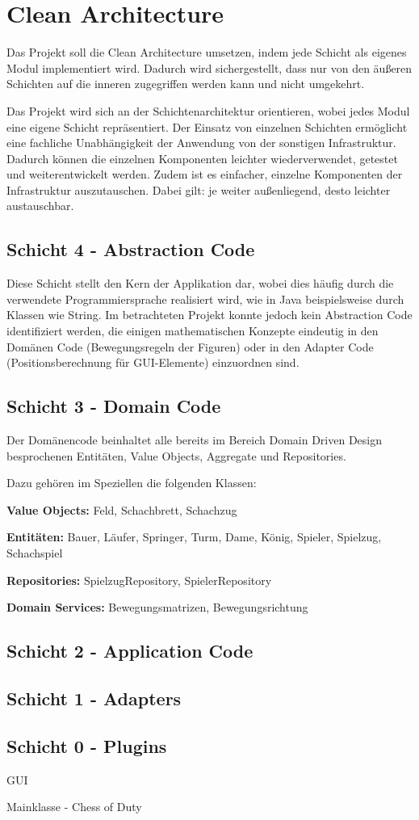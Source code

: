 \chapter{Clean Architecture}

Das Projekt soll die Clean Architecture umsetzen, indem jede Schicht als eigenes Modul implementiert wird. 
Dadurch wird sichergestellt, dass nur von den äußeren Schichten auf die inneren zugegriffen werden kann und nicht umgekehrt. 

Das Projekt wird sich an der Schichtenarchitektur orientieren, wobei jedes Modul eine eigene Schicht repräsentiert. 
Der Einsatz von einzelnen Schichten ermöglicht eine fachliche Unabhängigkeit der Anwendung von der sonstigen Infrastruktur. 
Dadurch können die einzelnen Komponenten leichter wiederverwendet, getestet und weiterentwickelt werden. 
Zudem ist es einfacher, einzelne Komponenten der Infrastruktur auszutauschen. 
Dabei gilt: je weiter außenliegend, desto leichter austauschbar.

\section*{Schicht 4 - Abstraction Code}

Diese Schicht stellt den Kern der Applikation dar, wobei dies häufig durch die verwendete Programmiersprache realisiert wird, wie in Java beispielsweise durch Klassen wie String.
Im betrachteten Projekt konnte jedoch kein Abstraction Code identifiziert werden, die einigen mathematischen Konzepte eindeutig in den Domänen Code (Bewegungsregeln der Figuren) oder in den Adapter Code (Positionsberechnung für GUI-Elemente) einzuordnen sind. 

\section*{Schicht 3 - Domain Code}

Der Domänencode beinhaltet alle bereits im Bereich \glqq Domain Driven Design\grqq{} besprochenen Entitäten, Value Objects, Aggregate und Repositories. 

Dazu gehören im Speziellen die folgenden Klassen:

\textbf{Value Objects:} Feld, Schachbrett, Schachzug

\textbf{Entitäten:} Bauer, Läufer, Springer, Turm, Dame, König, Spieler, Spielzug, Schachspiel

\textbf{Repositories:} SpielzugRepository, SpielerRepository

\textbf{Domain Services:} Bewegungsmatrizen, Bewegungsrichtung

\section*{Schicht 2 - Application Code}

\section*{Schicht 1 - Adapters}

\section*{Schicht 0 - Plugins}

GUI


Mainklasse - Chess of Duty
